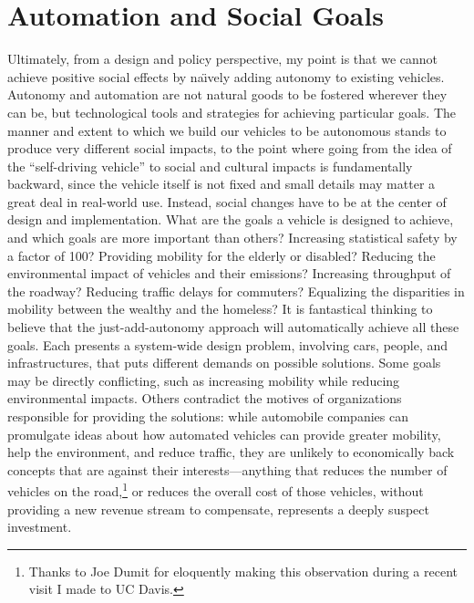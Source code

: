 
\section{Automation and Social Goals}

Ultimately, from a design and policy perspective, my point is that we
cannot achieve positive social effects by na\"{\i}vely adding autonomy to
existing vehicles. Autonomy and automation are not natural goods to be
fostered wherever they can be, but technological tools and strategies
for achieving particular goals. The manner and extent to which we
build our vehicles to be autonomous stands to produce very different
social impacts, to the point where going from the idea of the
``self-driving vehicle'' to social and cultural impacts is
fundamentally backward, since the vehicle itself is not fixed and
small details may matter a great deal in real-world use. Instead,
social changes have to be at the center of design and implementation.
What are the goals a vehicle is designed to achieve, and which goals
are more important than others? Increasing
statistical safety by a factor of 100? Providing mobility for the
elderly or disabled? Reducing the environmental impact of vehicles and
their emissions? Increasing throughput of the roadway? Reducing
traffic delays for commuters? Equalizing the 
disparities in mobility between the wealthy and the homeless? It is
fantastical thinking to believe that the just-add-autonomy approach
will automatically achieve all these goals. Each presents a
system-wide design problem, involving cars, people, and
infrastructures, that puts different demands on possible
solutions. Some goals may be directly conflicting, such as increasing
mobility while reducing 
environmental impacts.
Others contradict the motives of organizations responsible for
providing the solutions:  while automobile companies can promulgate
ideas about how automated vehicles can provide greater mobility, help
the environment, and reduce traffic, they are unlikely to economically
back concepts that are against their interests---anything that reduces
the number of vehicles on the road,\footnote{Thanks to Joe Dumit for eloquently
  making this observation during a recent visit I made to UC Davis.}
or reduces the overall cost of those 
vehicles, without providing a new revenue stream to compensate,
represents a deeply suspect investment. 


